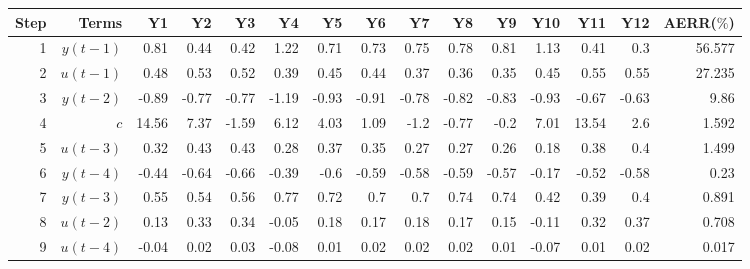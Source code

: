 \begin{tabular}{rrrrrrrrrrrrrrr}
Step & Terms & Y1 & Y2 & Y3 & Y4 & Y5 & Y6 & Y7 & Y8 & Y9 & Y10 & Y11 & Y12 & AERR($\%$) \\ 
\hline 
1 & $y(t-1)$ & 0.81 & 0.44 & 0.42 & 1.22 & 0.71 & 0.73 & 0.75 & 0.78 & 0.81 & 1.13 & 0.41 & 0.3 & 56.577 \\ 
2 & $u(t-1)$ & 0.48 & 0.53 & 0.52 & 0.39 & 0.45 & 0.44 & 0.37 & 0.36 & 0.35 & 0.45 & 0.55 & 0.55 & 27.235 \\ 
3 & $y(t-2)$ & -0.89 & -0.77 & -0.77 & -1.19 & -0.93 & -0.91 & -0.78 & -0.82 & -0.83 & -0.93 & -0.67 & -0.63 & 9.86 \\ 
4 & $c$ & 14.56 & 7.37 & -1.59 & 6.12 & 4.03 & 1.09 & -1.2 & -0.77 & -0.2 & 7.01 & 13.54 & 2.6 & 1.592 \\ 
5 & $u(t-3)$ & 0.32 & 0.43 & 0.43 & 0.28 & 0.37 & 0.35 & 0.27 & 0.27 & 0.26 & 0.18 & 0.38 & 0.4 & 1.499 \\ 
6 & $y(t-4)$ & -0.44 & -0.64 & -0.66 & -0.39 & -0.6 & -0.59 & -0.58 & -0.59 & -0.57 & -0.17 & -0.52 & -0.58 & 0.23 \\ 
7 & $y(t-3)$ & 0.55 & 0.54 & 0.56 & 0.77 & 0.72 & 0.7 & 0.7 & 0.74 & 0.74 & 0.42 & 0.39 & 0.4 & 0.891 \\ 
8 & $u(t-2)$ & 0.13 & 0.33 & 0.34 & -0.05 & 0.18 & 0.17 & 0.18 & 0.17 & 0.15 & -0.11 & 0.32 & 0.37 & 0.708 \\ 
9 & $u(t-4)$ & -0.04 & 0.02 & 0.03 & -0.08 & 0.01 & 0.02 & 0.02 & 0.02 & 0.01 & -0.07 & 0.01 & 0.02 & 0.017 \\ 
\hline 
\end{tabular}